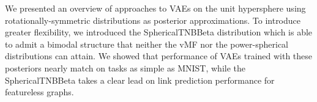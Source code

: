 We presented an overview of approaches to VAEs on the unit hypersphere using rotationally-symmetric
distributions as posterior approximations. To introduce greater flexibility, we introduced the
SphericalTNBBeta distribution which is able to admit a bimodal structure that neither the vMF nor the
power-spherical distributions can attain. We showed that performance of VAEs trained with these posteriors
nearly match on tasks as simple as MNIST, while the SphericalTNBBeta takes a clear lead on link prediction
performance for featureless graphs.